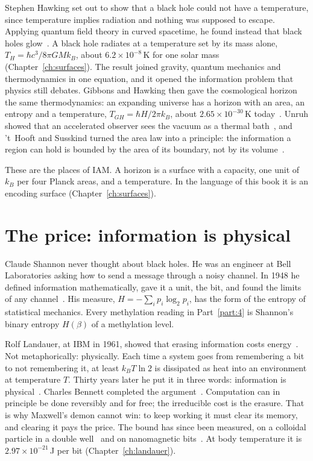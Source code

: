 Stephen Hawking set out to show that a black hole could not have a temperature, since temperature implies radiation and nothing was supposed
to escape. Applying quantum field theory in curved spacetime, he found instead that black holes glow~\cite{Hawking1974,Hawking1975}. A black
hole radiates at a temperature set by its mass alone, $T_H=\hbar c^3/8\pi GMk_B$, about $6.2\times10^{-8}$\,K for one solar mass
(Chapter~\ref{ch:surfaces}). \derived{} The result joined gravity, quantum mechanics and thermodynamics in one equation, and it opened the
information problem that physics still debates. Gibbons and Hawking then gave the cosmological horizon the same thermodynamics: an
expanding universe has a horizon with an area, an entropy and a temperature, $T_{GH}=\hbar H/2\pi k_B$, about $2.65\times10^{-30}$\,K
today~\cite{GibbonsHawking1977}. \derived{} Unruh showed that an accelerated observer sees the vacuum as a thermal bath~\cite{Unruh1976},
and 't~Hooft and Susskind turned the area law into a principle: the information a region can hold is bounded by the area of its boundary,
not by its volume~\cite{tHooft1993,Susskind1995}.

These are the places of IAM. A horizon is a surface with a capacity, one unit of $k_B$ per four Planck areas, and a temperature. In the
language of this book it is an encoding surface (Chapter~\ref{ch:surfaces}).

\section*{The price: information is physical}

Claude Shannon never thought about black holes. He was an engineer at Bell Laboratories asking how to send a message through a noisy channel.
In 1948 he defined information mathematically, gave it a unit, the bit, and found the limits of any channel~\cite{Shannon1948}. His measure,
$H=-\sum_ip_i\log_2p_i$, has the form of the entropy of statistical mechanics. Every methylation reading in Part~\ref{part:4} is Shannon's
binary entropy $H(\beta)$ of a methylation level.

Rolf Landauer, at IBM in 1961, showed that erasing information costs energy~\cite{Landauer1961}. Not metaphorically: physically. Each time a
system goes from remembering a bit to not remembering it, at least $k_BT\ln2$ is dissipated as heat into an environment at temperature $T$.
\derived{} Thirty years later he put it in three words: information is physical~\cite{Landauer1991}. Charles Bennett completed the
argument~\cite{Bennett1982}. Computation can in principle be done reversibly and for free; the irreducible cost is the erasure. That is why
Maxwell's demon cannot win: to keep working it must clear its memory, and clearing it pays the price. The bound has since been measured, on a
colloidal particle in a double well~\cite{Berut2012} and on nanomagnetic bits~\cite{Hong2016}. \observed{} At body temperature it is
$2.97\times10^{-21}$\,J per bit (Chapter~\ref{ch:landauer}). \calc

